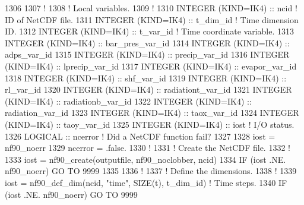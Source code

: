 \begin{DoxyCode}
1306 
1307     \textcolor{comment}{!}
1308     \textcolor{comment}{! Local variables.}
1309     \textcolor{comment}{!}
1310     \textcolor{keywordtype}{INTEGER (KIND=IK4)}          :: ncid                                                 \textcolor{comment}{! ID of NetCDF
       file.}
1311     \textcolor{keywordtype}{INTEGER (KIND=IK4)}          :: t\_dim\_id                                             \textcolor{comment}{! Time dimension
       ID.}
1312     \textcolor{keywordtype}{INTEGER (KIND=IK4)}          :: t\_var\_id                                             \textcolor{comment}{! Time coordinate
       variable.}
1313     \textcolor{keywordtype}{INTEGER (KIND=IK4)}          :: bar\_pres\_var\_id
1314     \textcolor{keywordtype}{INTEGER (KIND=IK4)}          :: adps\_var\_id
1315     \textcolor{keywordtype}{INTEGER (KIND=IK4)}          :: precip\_var\_id
1316     \textcolor{keywordtype}{INTEGER (KIND=IK4)}          :: lprecip\_var\_id
1317     \textcolor{keywordtype}{INTEGER (KIND=IK4)}          :: evapor\_var\_id
1318     \textcolor{keywordtype}{INTEGER (KIND=IK4)}          :: shf\_var\_id
1319     \textcolor{keywordtype}{INTEGER (KIND=IK4)}          :: rl\_var\_id
1320     \textcolor{keywordtype}{INTEGER (KIND=IK4)}          :: radiationt\_var\_id
1321     \textcolor{keywordtype}{INTEGER (KIND=IK4)}          :: radiationb\_var\_id
1322     \textcolor{keywordtype}{INTEGER (KIND=IK4)}          :: radiation\_var\_id
1323     \textcolor{keywordtype}{INTEGER (KIND=IK4)}          :: taox\_var\_id
1324     \textcolor{keywordtype}{INTEGER (KIND=IK4)}          :: taoy\_var\_id
1325     \textcolor{keywordtype}{INTEGER (KIND=IK4)}          :: iost                                                 \textcolor{comment}{! I/O status.}
1326     \textcolor{keywordtype}{LOGICAL}                     :: ncerror                                               \textcolor{comment}{! Did a NetCDF
       function fail?}
1327 
1328     iost    = nf90\_noerr
1329     ncerror = .false.
1330     \textcolor{comment}{!}
1331     \textcolor{comment}{! Create the NetCDF file.}
1332     \textcolor{comment}{!}
1333     iost    = nf90\_create(outputfile, nf90\_noclobber, ncid)
1334     \textcolor{keywordflow}{IF} (iost .NE. nf90\_noerr) \textcolor{keywordflow}{GO TO} 9999
1335 
1336     \textcolor{comment}{!}
1337     \textcolor{comment}{! Define the dimensions.}
1338     \textcolor{comment}{!}
1339     iost    = nf90\_def\_dim(ncid, \textcolor{stringliteral}{"time"}, \textcolor{keyword}{SIZE}(t), t\_dim\_id)                          \textcolor{comment}{! Time steps.}
1340     \textcolor{keywordflow}{IF} (iost .NE. nf90\_noerr) \textcolor{keywordflow}{GO TO} 9999

\end{DoxyCode}
